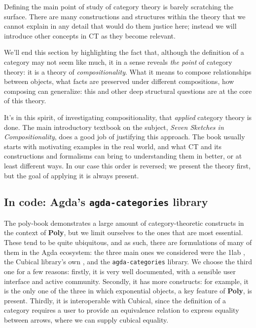 Defining the main point of study of category theory is barely scratching the surface. There are many constructions and structures within the theory that we cannot explain in any detail that would do them justice here; instead we will introduce other concepts in CT as they become relevant.

We'll end this section by highlighting the fact that, although the definition of a category may not seem like much, it in a sense reveals \textit{the point} of category theory: it is a theory of \textit{compositionality}. What it means to compose relationships between objects, what facts are preserved under different compositions, how composing can generalize: this and other deep structural questions are at the core of this theory. 

It's in this spirit, of investigating compositionality, that \textit{applied} category theory is done. The main introductory textbook on the subject, \textit{Seven Sketches in Compositionality}, \cite{seven-sketches} does a good job of justifying this approach. The book usually starts with motivating examples in the real world, and what CT and its constructions and formalisms can bring to understanding them in better, or at least different ways. In our case this order is reversed; we present the theory first, but the goal of applying it is always present.


\subsection{In code: Agda's \texttt{agda-categories} library}

The poly-book demonstrates a large amount of category-theoretic constructs in the context of \textbf{Poly}, but we limit ourselves to the ones that are most essential. These tend to be quite ubiquitous, and as such, there are formulations of many of them in the Agda ecosystem: the three main ones we considered were the 1lab \cite{1lab}, the Cubical library's own \cite{cubical-cat}, and the \texttt{agda-categories} \cite{agda-cats} library. We choose the third one for a few reasons: firstly, it is very well documented, with a sensible user interface and active community. Secondly, it has more constructs: for example, it is the only one of the three in which exponential objects, a key feature of \textbf{Poly}, is present. Thirdly, it is interoperable with Cubical, since the definition of a category requires a user to provide an equivalence relation to express equality between arrows, where we can supply cubical equality.

